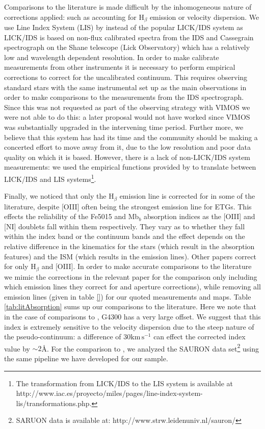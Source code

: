 	Comparisons to the literature is made difficult by the inhomogeneous nature of corrections applied: such as accounting for H$_\beta$ emission or velocity dispersion. We use Line Index System (LIS) by \citet{Vazdekis2010} instead of the popular LICK/IDS system \citep{Faber1985, Worthey1994} as LICK/IDS is based on non-flux calibrated spectra from the IDS and Cassegrain spectrograph on the Shane telescope (Lick Observatory) which has a relatively low and wavelength dependent resolution. In order to make calibrate measurements from other instruments it is necessary to perform empirical corrections to correct for the uncalibrated continuum. This requires observing standard stars with the same instrumental set up as the main observations in order to make comparisons to the measurements from the IDS spectrograph. Since this was not requested as part of the observing strategy with VIMOS we were not able to do this: a later proposal would not have worked since VIMOS was substantially upgraded in the intervening time period. Further more, we believe that this system has had its time and the community should be making a concerted effort to move away from it, due to the low resolution and poor data quality on which it is based. However, there is a lack of non-LICK/IDS system measurements: we used the empirical functions provided by \citet{Vazdekis2010} to translate between LICK/IDS and LIS systems\footnote{The transformation from LICK/IDS to the LIS system is available at http://www.iac.es/proyecto/miles/pages/line-index-system-lis/transformations.php.}. 


	Finally, we noticed that only the H$_\beta$ emission line is corrected for in some of the literature, despite [OIII] often being the strongest emission line for ETGs. This effects the reliability of the Fe5015 and Mb$_b$ absorption indices as the [OIII] and [NI] doublets fall within them respectively. They vary as to whether they fall within the index band or the continuum bands and the effect depends on the relative difference in the kinematics for the stars (which result in the absorption features) and the ISM (which results in the emission lines). Other papers correct for only H$_\beta$ and [OIII]. In order to make accurate comparisons to the literature we mimic the corrections in the relevant paper for the comparison only including which emission lines they correct for and aperture corrections), while removing all emission lines (given in table \ref{}) for our quoted measurements and maps. Table \ref{tab:litAbsorption} sums up our comparisons to the literature. Here we note that in the case of comparisons to \citet{Rampazzo2005}, G4300 has a very large offset. We suggest that this index is extremely sensitive to the velocity dispersion due to the steep nature of the pseudo-continuum: a difference of $30 \mathrm{km \, s^{-1}}$ can effect the corrected index value by $\sim 2$\AA. For the comparison to \citet{Vazdekis2010}, we analyzed the SAURON data set\footnote{SARUON data is available at: http://www.strw.leidenuniv.nl/sauron/} \citep{Emsellem2004} using the same pipeline we have developed for our sample. 

